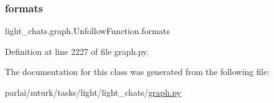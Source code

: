 \subsubsection{\texorpdfstring{formats}{formats}}
{\footnotesize\ttfamily light\+\_\+chats.\+graph.\+Unfollow\+Function.\+formats}



Definition at line 2227 of file graph.\+py.



The documentation for this class was generated from the following file\+:\begin{DoxyCompactItemize}
\item 
parlai/mturk/tasks/light/light\+\_\+chats/\hyperlink{parlai_2mturk_2tasks_2light_2light__chats_2graph_8py}{graph.\+py}\end{DoxyCompactItemize}
